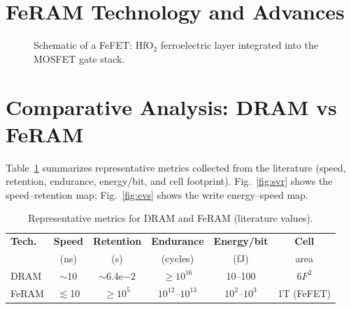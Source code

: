 \documentclass[journal]{IEEEtran}
\begin{document}
\section{FeRAM Technology and Advances}


\begin{figure}[!t]
\centering
{}
\caption{Schematic of a FeFET: HfO$_2$ ferroelectric layer integrated into the MOSFET gate stack.}
\label{fig:fefet_structure}
\end{figure}

\section{Comparative Analysis: DRAM vs FeRAM}
\label{sec:comparison}
Table~\ref{tab:comparison} summarizes representative metrics collected from the literature (speed, retention, endurance, energy/bit, and cell footprint). Fig.~\ref{fig:svr} shows the speed--retention map; Fig.~\ref{fig:evs} shows the write energy--speed map.

\begin{table}[!t]
\caption{Representative metrics for DRAM and FeRAM (literature values).}
\label{tab:comparison}
\centering
\begin{tabular}{@{}lccccc@{}}
\toprule
\textbf{Tech.} & \textbf{Speed} & \textbf{Retention} & \textbf{Endurance} & \textbf{Energy/bit} & \textbf{Cell} \\
 & (ns) & (s) & (cycles) & (fJ) & area \\
\midrule
DRAM  & $\sim$10 & $\sim$6.4e$-2$ & $\ge 10^{16}$ & 10--100 & 6$F^2$ \\
FeRAM & $\lesssim$10 & $\ge 10^{5}$ & $10^{12}$--$10^{13}$ & $10^{2}$--$10^{3}$ & 1T (FeFET) \\
\bottomrule
\end{tabular}
\end{table}
\end{document}
